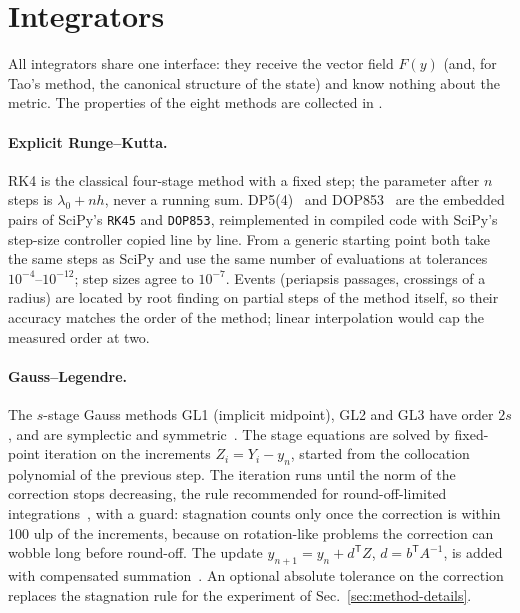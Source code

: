 \section{Integrators}
\label{sec:integrators}

All integrators share one interface: they receive the vector field $F(y)$ (and, for Tao's
method, the canonical structure of the state) and know nothing about the metric. The
properties of the eight methods are collected in .

\begin{table}[t]
\caption{\label{tab:methods}The integrators (T1). For the implicit methods the cost per step
is the number of stages times the number of fixed-point iterations; the measured values are
averages over $10^4$ periods of the orbit $(p, e) = (20, 0.5)$ at 1000 steps per period.}
\centering\small
\resizebox{\textwidth}{!}{}
\end{table}

\paragraph{Explicit Runge--Kutta.} RK4 is the classical four-stage method with a fixed step;
the parameter after $n$ steps is $\lambda_0 + nh$, never a running sum. DP5(4)~\cite{dormand1980}
and DOP853~\cite{hnw1993} are the embedded pairs of SciPy's \texttt{RK45} and \texttt{DOP853},
reimplemented in compiled code with SciPy's step-size controller copied line by line. From a
generic starting point both take the same steps as SciPy and use the same number of
evaluations at tolerances $10^{-4}$--$10^{-12}$; step sizes agree to $10^{-7}$. Events
(periapsis passages, crossings of a radius) are located by root finding on partial steps of
the method itself, so their accuracy matches the order of the method; linear interpolation
would cap the measured order at two.

\paragraph{Gauss--Legendre.} The $s$-stage Gauss methods GL1 (implicit midpoint), GL2 and GL3
have order $2s$, and are symplectic and symmetric~\cite{gni2006}. The stage equations are
solved by fixed-point iteration on the increments $Z_i = Y_i - y_n$, started from the
collocation polynomial of the previous step. The iteration runs until the norm of the
correction stops decreasing, the rule recommended for round-off-limited
integrations~\cite{hairer2008}, with a guard: stagnation counts only once the correction is
within 100 ulp of the increments, because on rotation-like problems the correction can wobble
long before round-off. The update $y_{n+1} = y_n + d^\mathsf{T}Z$, $d = b^\mathsf{T}A^{-1}$, is
added with compensated summation~\cite{kahan1965}. An optional absolute tolerance on the
correction replaces the stagnation rule for the experiment of Sec.~\ref{sec:method-details}.

